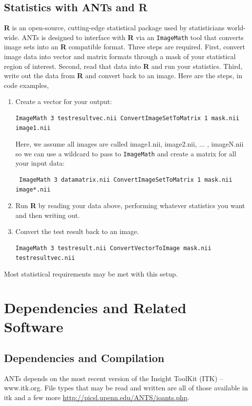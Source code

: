 \documentclass{InsightArticle}
\begin{document}
\subsection{Statistics with ANTs and {\bf R}}
{\bf R} is an open-source, cutting-edge statistical package 
used by statisticians world-wide.   ANTs is designed to 
interface with {\bf R} via an \texttt{ImageMath} tool that converts 
image sets into an {\bf R} compatible format.  
Three steps are required.  First, convert image data into 
vector and matrix formats through a mask of your statistical 
region of interest.  Second, read that data into {\bf R} and 
run your statistics.  Third, write out the data from {\bf R} and 
convert back to an image.  Here are the steps, in code examples,
\begin{enumerate}
\item Create a vector for your output: 
\begin{verbatim} 
ImageMath 3 testresultvec.nii ConvertImageSetToMatrix 1 mask.nii image1.nii
\end{verbatim}
Here, we assume all images are called image1.nii, image2.nii, ... , imageN.nii so we 
can use a wildcard to pass to \texttt{ImageMath} and 
create a matrix for all your input data: 
\begin{verbatim} 
 ImageMath 3 datamatrix.nii ConvertImageSetToMatrix 1 mask.nii image*.nii 
\end{verbatim}
\item   Run {\bf R} by reading your data above, performing whatever statistics you want and then 
writing out.  
\item   Convert the test result back to an image.  
\begin{verbatim} 
ImageMath 3 testresult.nii ConvertVectorToImage mask.nii testresultvec.nii
\end{verbatim}
\end{enumerate}
Most statistical requirements may be met with this setup. 
\newpage
\section{Dependencies and Related Software}
\subsection{Dependencies and Compilation}\label{sec:comp}
ANTs depends on the most recent version of the Insight ToolKit (ITK)
-- www.itk.org.   File types that may be read and written are 
all of those available in itk and a few more \href{http://picsl.upenn.edu/ANTS/ioants.php}{http://picsl.upenn.edu/ANTS/ioants.php}.
\end{document}
